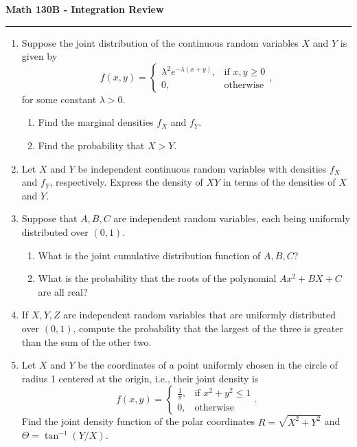 \documentclass[11pt,letterpaper]{article}
\begin{document}
\begin{center}
{\bf \Large Math 130B - Integration Review}
\vspace{0.2cm}
\hrule
\end{center}

\begin{enumerate}
	\item Suppose the joint distribution of the continuous random variables $X$ and $Y$ is given by
	\[
		f(x,y) = \begin{cases}\lambda^2e^{-\lambda(x+y)},& \text{if }x,y\geq 0\\
			0,& \text{otherwise}
			\end{cases},
	\]
	for some constant $\lambda > 0$.
	\begin{enumerate}
		\item Find the marginal densities $f_X$ and $f_Y$.
		\vfill
		\item Find the probability that $X> Y$.
	\end{enumerate}

	\vfill

	\item Let $X$ and $Y$ be independent continuous random variables with densities $f_X$ and $f_Y$, respectively. Express the density of $XY$ in terms of the densities of $X$ and $Y$.

	\vfill

	\item Suppose that $A, B, C$ are independent random variables, each being uniformly distributed over $(0,1)$.
	\begin{enumerate}
		\item What is the joint cumulative distribution function of $A, B, C$?
		\vfill
		\item What is the probability that the roots of the polynomial $Ax^2+BX+C$ are all real?
	\end{enumerate}

	\vfill

	\item If $X, Y, Z$ are independent random variables that are uniformly distributed over $(0,1)$, compute the probability that the largest of the three is greater than the sum of the other two.
	\vfill

	\item Let $X$ and $Y$ be the coordinates of a point uniformly chosen in the circle of radius 1 centered at the origin, i.e., their joint density is
	\[
		f(x,y) = \begin{cases}
			\frac{1}{\pi}, & \text{if }x^2 + y^2 \leq 1\\
			0,&\text{otherwise}
		\end{cases}.
	\]
	Find the joint density function of the polar coordinates $R = \sqrt{X^2 + Y^2}$ and $\Theta = \tan^{-1}(Y/X)$.
	\vfill
\end{enumerate}
\end{document}
